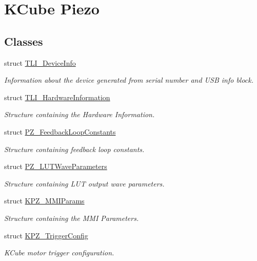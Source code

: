 \hypertarget{group___k_cube_piezo}{}\section{K\+Cube Piezo}
\label{group___k_cube_piezo}
\subsection*{Classes}
\begin{DoxyCompactItemize}
\item 
struct \hyperlink{struct_t_l_i___device_info}{T\+L\+I\+\_\+\+Device\+Info}
\begin{DoxyCompactList}\small\item\em Information about the device generated from serial number and U\+SB info block. \end{DoxyCompactList}\item 
struct \hyperlink{struct_t_l_i___hardware_information}{T\+L\+I\+\_\+\+Hardware\+Information}
\begin{DoxyCompactList}\small\item\em Structure containing the Hardware Information. \end{DoxyCompactList}\item 
struct \hyperlink{struct_p_z___feedback_loop_constants}{P\+Z\+\_\+\+Feedback\+Loop\+Constants}
\begin{DoxyCompactList}\small\item\em Structure containing feedback loop constants. \end{DoxyCompactList}\item 
struct \hyperlink{struct_p_z___l_u_t_wave_parameters}{P\+Z\+\_\+\+L\+U\+T\+Wave\+Parameters}
\begin{DoxyCompactList}\small\item\em Structure containing L\+UT output wave parameters. \end{DoxyCompactList}\item 
struct \hyperlink{struct_k_p_z___m_m_i_params}{K\+P\+Z\+\_\+\+M\+M\+I\+Params}
\begin{DoxyCompactList}\small\item\em Structure containing the M\+MI Parameters. \end{DoxyCompactList}\item 
struct \hyperlink{struct_k_p_z___trigger_config}{K\+P\+Z\+\_\+\+Trigger\+Config}
\begin{DoxyCompactList}\small\item\em K\+Cube motor trigger configuration. \end{DoxyCompactList}\end{DoxyCompactItemize}

